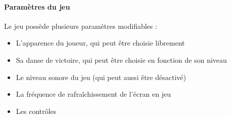 \paragraph{Paramètres du jeu}

    Le jeu possède plusieurs paramètres modifiables : 
    \begin{itemize}
        \item L'apparence du joueur, qui peut être choisie librement
        \item Sa danse de victoire, qui peut être choisie en fonction de son niveau
        \item Le niveau sonore du jeu (qui peut aussi être désactivé)
        \item La fréquence de rafraîchissement de l'écran en jeu
        \item Les contrôles
    \end{itemize}